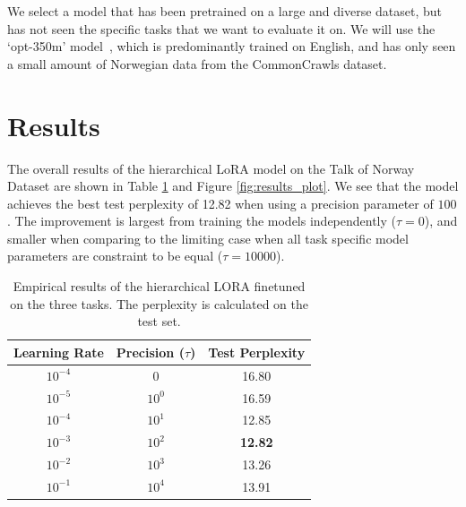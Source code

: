 \documentclass{article}
\begin{document}
We select a model that has been pretrained on a large and diverse dataset, but has not seen the specific tasks that we want to evaluate it on. We will use the `opt-350m' model~\cite{zhang_opt_2022}, which is predominantly trained on English, and has only seen a small amount of Norwegian data from the CommonCrawls dataset.

\section{Results}
The overall results of the hierarchical LoRA model on the Talk of Norway Dataset are shown in Table \ref{tbl:results} and Figure \ref{fig:results_plot}. We see that the model achieves the best test perplexity of 12.82 when using a precision parameter of $100$. The improvement is largest from training the models independently ($\tau = 0$), and smaller when comparing to the limiting case when all task specific model parameters are constraint to be equal ($\tau=10000$).

\begin{table}[h] 
    \centering
    \begin{tabular}{ccc}
        \toprule
        Learning Rate & Precision ($\tau$) & Test Perplexity \\
        \midrule
            $10^{-4}$ &              0 &                 16.80 \\
            $10^{-5}$ &       $10^{0}$ &                 16.59 \\
            $10^{-4}$ &       $10^{1}$ &                 12.85 \\
            $10^{-3}$ &       $10^{2}$ &                 \textbf{12.82} \\
            $10^{-2}$ &       $10^{3}$ &                 13.26 \\
            $10^{-1}$ &       $10^{4}$ &                 13.91 \\
        \bottomrule
        \end{tabular}
        \caption{Empirical results of the hierarchical LORA finetuned on the three tasks. The perplexity is calculated on the test set.}
        \label{tbl:results}
    \end{table}
\end{document}
